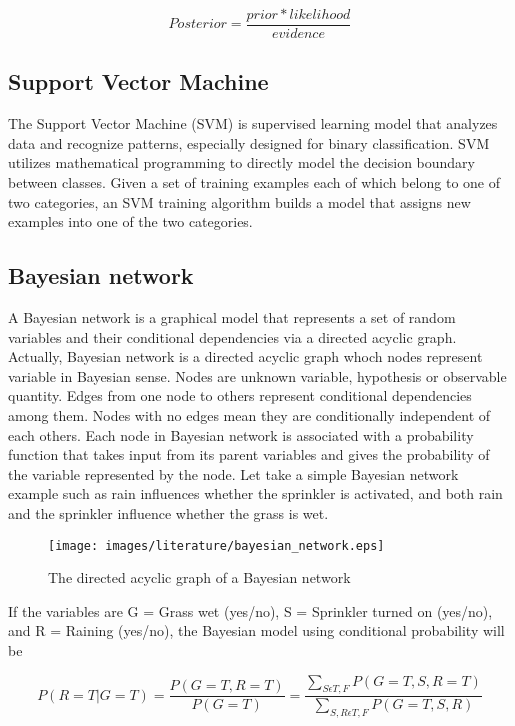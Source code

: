 \documentclass[12pt]{report}
\begin{document}
\begin{equation}
Posterior=\frac{prior * likelihood}{evidence}
\label{eq:}
\end{equation}

\subsection{Support Vector Machine}

The Support Vector Machine (SVM) is supervised learning model that analyzes data and recognize patterns, especially designed for binary classification. SVM utilizes mathematical programming to directly model the decision boundary between classes. Given a set of training examples  each of which belong to one of two categories, an SVM training algorithm builds a model that assigns new examples into one of the two categories.


\subsection{Bayesian network}
A Bayesian network is a graphical model that represents a set of random variables and their conditional dependencies via a directed acyclic graph. Actually, Bayesian network is a directed acyclic graph whoch nodes represent variable in Bayesian sense. Nodes are unknown variable, hypothesis or observable quantity. Edges from one node to others represent conditional dependencies among them. Nodes with no edges mean they are conditionally independent of each others. Each node in Bayesian network is associated with a probability function that takes input from its parent variables and gives the probability of the variable represented by the node. 
Let take a simple Bayesian network example such as rain influences whether the sprinkler is activated, and both rain and the sprinkler influence whether the grass is wet.

\begin{figure}[h!]
  \centering
    \texttt{[image: images/literature/bayesian\_network.eps]}
		\caption{The directed acyclic graph of a Bayesian network}
		\label{Bayesian_network_graph}
\end{figure}

If the variables are G = Grass wet (yes/no), S = Sprinkler turned on (yes/no), and R = Raining (yes/no), the Bayesian model using conditional probability will be

\begin{equation}
P( R = T | G = T )=\frac{P(G = T,R = T)}{P(G = T)}=\frac{\sum_{S \epsilon {T,F}} P(G = T, S, R=T)}{ \sum_{S,R \epsilon {T,F}} P(G=T,S,R)}
\label{eq:bayesian_equation}
\end{equation} 
\end{document}
